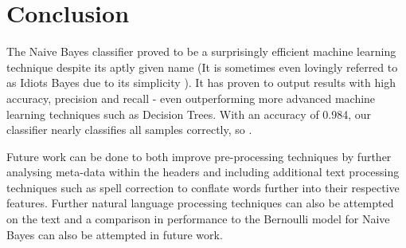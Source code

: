 \section{Conclusion}

The Naive Bayes classifier proved to be a surprisingly efficient machine learning technique despite its aptly given name (It is sometimes even lovingly referred to as Idiots Bayes due to its simplicity \cite{idiotsbayes2001}).
It has proven to output results with high accuracy, precision and recall - even outperforming more advanced machine learning techniques such as Decision Trees.
With an accuracy of 0.984, our classifier nearly classifies all samples correctly, so .

Future work can be done to both improve pre-processing techniques by further analysing meta-data within the headers and including additional text processing techniques such as spell correction to conflate words further into their respective features. Further natural language processing techniques can also be attempted on the text and a comparison in performance to the Bernoulli model for Naive Bayes can also be attempted in future work.

